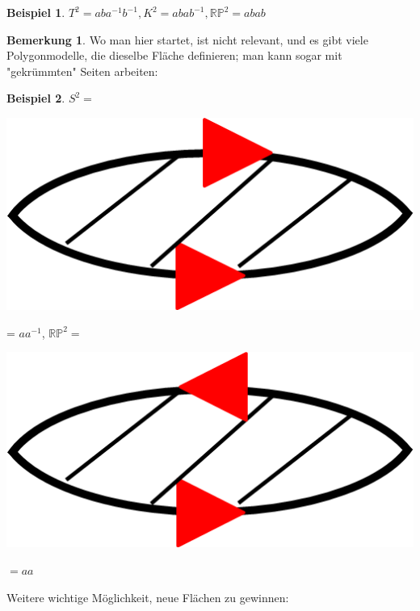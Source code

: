 \documentclass[a4paper,11pt,notitlepage]{report}
\theoremstyle{definition}
\newtheorem{remark}{Bemerkung}[chapter]
\newtheorem{example}{Beispiel}[chapter]
\newcommand{\R}{{\ensuremath{\mathbb{R}}}}
\newcommand{\Prim}{{\ensuremath{\mathbb{P}}}}
\begin{document}
\begin{example}
	$T^2 = a b a^{-1} b^{-1}, K^2 = abab^{-1}, \R \Prim^2 = abab$
\end{example}

\begin{remark}
	Wo man hier startet, ist nicht relevant, und es gibt viele Polygonmodelle, die dieselbe Fläche definieren; man kann sogar mit "gekrümmten" Seiten arbeiten: 
\end{remark}

\begin{example}
	$S^2 = $ \begin{center}
	 	\includegraphics[scale=0.5]{images/2012_01_10_Bild12.png}
	 \end{center} = $a a^{-1}$, $\R \Prim^2 = $ 	 \begin{center}
	 	\includegraphics[scale=0.5]{images/2012_01_10_Bild13.png}
	 \end{center} $= aa$
\end{example}

Weitere wichtige Möglichkeit, neue Flächen zu gewinnen:
\end{document}
